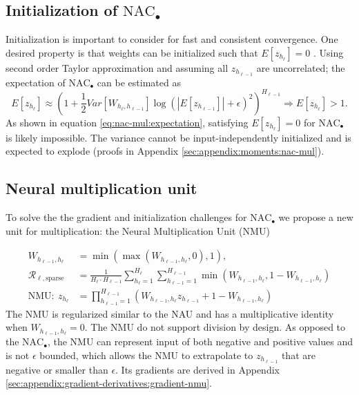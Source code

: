\subsection{Initialization of \texorpdfstring{$\mathrm{NAC}_{\bullet}$}{NAC-mul}}
Initialization is important to consider for fast and consistent convergence.
One desired property is that weights can be initialized such that $E[z_{h_\ell}] = 0$ \cite{glorot-initialization}. Using second order Taylor approximation and assuming all $z_{h_{\ell-1}}$ are uncorrelated; the expectation of $\mathrm{NAC}_{\bullet}$ can be estimated as
\begin{equation}
E[z_{h_\ell}] \approx \left(1 + \frac{1}{2} Var[W_{h_\ell, h_{\ell-1}}] \log(|E[z_{h_{\ell-1}}]| + \epsilon)^2\right)^{H_{\ell-1}} \Rightarrow E[z_{h_\ell}] > 1.
\label{eq:nac-mul:expectation}
\end{equation}
As shown in equation \ref{eq:nac-mul:expectation}, satisfying $E[z_{h_\ell}] = 0$ for $\mathrm{NAC}_{\bullet}$ is likely impossible. The variance cannot be input-independently initialized and is expected to explode (proofs in Appendix \ref{sec:appendix:moments:nac-mul}).

\subsection{Neural multiplication unit}
\label{sec:method:nmu}
To solve the the gradient and initialization challenges for $\mathrm{NAC}_{\bullet}$ we propose a new unit for multiplication: the Neural Multiplication Unit (NMU)

\begin{align}
W_{h_{\ell-1},h_\ell} &= \min(\max(W_{h_{\ell-1},h_\ell}, 0), 1), \\
\mathcal{R}_{\ell,\mathrm{sparse}} &= \frac{1}{H_\ell \cdot H_{\ell-1}} \sum_{h_\ell=1}^{H_\ell} \sum_{h_{\ell-1}=1}^{H_{\ell-1}} \min\left(W_{h_{\ell-1},h_\ell}, 1 - W_{h_{\ell-1},h_\ell}\right) \\
\textrm{NMU}:\ z_{h_\ell} &= \prod_{h_{\ell-1}=1}^{H_{\ell-1}} \left(W_{h_{\ell-1},h_\ell} z_{h_{\ell-1}} + 1 - W_{h_{\ell-1},h_\ell} \right) \label{eq:nmu-defintion}
\end{align}
The NMU is regularized similar to the NAU and has a multiplicative identity when $W_{h_{\ell-1},h_\ell}=0$.
The NMU do not support division by design.
As opposed to the $\mathrm{NAC}_{\bullet}$, the NMU can represent input of both negative and positive values and is not $\epsilon$ bounded, which allows the NMU to extrapolate to $z_{h_{\ell-1}}$ that are negative or smaller than $\epsilon$. Its gradients are derived in Appendix \ref{sec:appendix:gradient-derivatives:gradient-nmu}.

